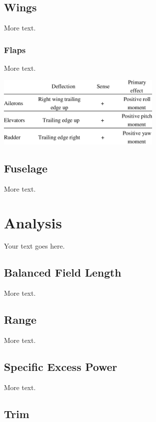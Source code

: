 \documentclass[11pt]{article} %
\begin{document}
\subsection{Wings}

More text.

\subsubsection{Flaps}

More text.
\begin{center}
    \includegraphics[width=0.6\textwidth]{cs_sign_conventions}
\end{center}

\subsection{Fuselage}

More text.

\section{Analysis}

Your text goes here.

\subsection{Balanced Field Length}

More text.

\subsection{Range}

More text.

\subsection{Specific Excess Power}

More text.

\subsection{Trim}
\end{document}
